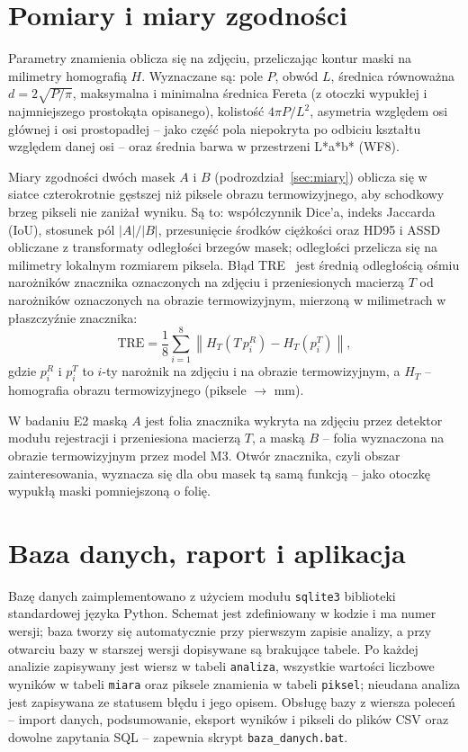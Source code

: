 \section{Pomiary i miary zgodności}
\label{sec:impl-pomiary}

Parametry znamienia oblicza się na zdjęciu, przeliczając kontur maski na milimetry homografią $H$. Wyznaczane są: pole $P$, obwód $L$, średnica równoważna $d = 2\sqrt{P/\pi}$, maksymalna i minimalna średnica Fereta (z otoczki wypukłej i najmniejszego prostokąta opisanego), kolistość $4\pi P / L^2$, asymetria względem osi głównej i osi prostopadłej -- jako część pola niepokryta po odbiciu kształtu względem danej osi -- oraz średnia barwa w przestrzeni L*a*b* (WF8).

Miary zgodności dwóch masek $A$ i $B$ (podrozdział~\ref{sec:miary}) oblicza się w siatce czterokrotnie gęstszej niż piksele obrazu termowizyjnego, aby schodkowy brzeg pikseli nie zaniżał wyniku. Są to: współczynnik Dice'a, indeks Jaccarda (IoU), stosunek pól $|A|/|B|$, przesunięcie środków ciężkości oraz HD95 i ASSD obliczane z transformaty odległości brzegów masek; odległości przelicza się na milimetry lokalnym rozmiarem piksela. Błąd TRE~\cite{fitzpatrick1998} jest średnią odległością ośmiu narożników znacznika oznaczonych na zdjęciu i przeniesionych macierzą $T$ od narożników oznaczonych na obrazie termowizyjnym, mierzoną w milimetrach w płaszczyźnie znacznika:
\begin{equation}
  \mathrm{TRE} = \frac{1}{8}\sum_{i=1}^{8} \left\| H_T\!\left(T\,p_i^{R}\right) - H_T\!\left(p_i^{T}\right) \right\|,
  \label{eq:tre}
\end{equation}
gdzie $p_i^{R}$ i $p_i^{T}$ to $i$-ty narożnik na zdjęciu i na obrazie termowizyjnym, a $H_T$ -- homografia obrazu termowizyjnego (piksele $\to$ mm).

W badaniu E2 maską $A$ jest folia znacznika wykryta na zdjęciu przez detektor modułu rejestracji i przeniesiona macierzą $T$, a maską $B$ -- folia wyznaczona na obrazie termowizyjnym przez model M3. Otwór znacznika, czyli obszar zainteresowania, wyznacza się dla obu masek tą samą funkcją -- jako otoczkę wypukłą maski pomniejszoną o folię.

\section{Baza danych, raport i aplikacja}
\label{sec:impl-aplikacja}

Bazę danych zaimplementowano z użyciem modułu \texttt{sqlite3} biblioteki standardowej języka Python. Schemat jest zdefiniowany w kodzie i ma numer wersji; baza tworzy się automatycznie przy pierwszym zapisie analizy, a przy otwarciu bazy w starszej wersji dopisywane są brakujące tabele. Po każdej analizie zapisywany jest wiersz w tabeli \texttt{analiza}, wszystkie wartości liczbowe wyników w tabeli \texttt{miara} oraz piksele znamienia w tabeli \texttt{piksel}; nieudana analiza jest zapisywana ze statusem błędu i jego opisem. Obsługę bazy z wiersza poleceń -- import danych, podsumowanie, eksport wyników i pikseli do plików CSV oraz dowolne zapytania SQL -- zapewnia skrypt \texttt{baza\_danych.bat}.

